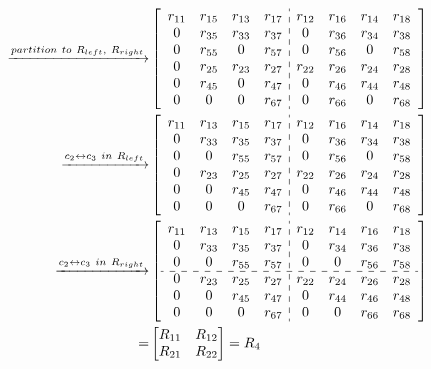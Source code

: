 \documentclass[12pt]{article}
\numberwithin{equation}{section}
\begin{document}
 \begin{align*}
\xrightarrow{partition\ to\ R_{left},\ R_{right}}
&\begin{bmatrix}
\begin{array}{cccc:cccc}
 r_{11} & r_{15} & r_{13} & r_{17} & r_{12} & r_{16} & r_{14} & r_{18}\\
 0      & r_{35} & r_{33} & r_{37} & 0      & r_{36} & r_{34} & r_{38}\\
 0      & r_{55} & 0      & r_{57} & 0      & r_{56} & 0      & r_{58}\\
 0      & r_{25} & r_{23} & r_{27} & r_{22} & r_{26} & r_{24} & r_{28}\\
 0      & r_{45} & 0      & r_{47} & 0      & r_{46} & r_{44} & r_{48}\\
 0      & 0      & 0      & r_{67} & 0      & r_{66} & 0      & r_{68}\\
\end{array}
\end{bmatrix}\\
\xrightarrow{c_{2} \leftrightarrow c_{3}\ in\ R_{left}}
&\begin{bmatrix}
\begin{array}{cccc:cccc}
 r_{11} & r_{13} & r_{15} & r_{17} & r_{12} & r_{16} & r_{14} & r_{18}\\
 0      & r_{33} & r_{35} & r_{37} & 0      & r_{36} & r_{34} & r_{38}\\
 0      & 0      & r_{55} & r_{57} & 0      & r_{56} & 0      & r_{58}\\
 0      & r_{23} & r_{25} & r_{27} & r_{22} & r_{26} & r_{24} & r_{28}\\
 0      & 0      & r_{45} & r_{47} & 0      & r_{46} & r_{44} & r_{48}\\
 0      & 0      & 0      & r_{67} & 0      & r_{66} & 0      & r_{68}\\
\end{array}
\end{bmatrix}\\
\xrightarrow{c_{2} \leftrightarrow c_{3}\ in\ R_{right}}
&\begin{bmatrix}
\begin{array}{cccc:cccc}
 r_{11} & r_{13} & r_{15} & r_{17} & r_{12} & r_{14} & r_{16} & r_{18}\\
 0      & r_{33} & r_{35} & r_{37} & 0      & r_{34} & r_{36} & r_{38}\\
 0      & 0      & r_{55} & r_{57} & 0      & 0      & r_{56} & r_{58}\\
 \cdashline{1-8}
 0      & r_{23} & r_{25} & r_{27} & r_{22} & r_{24} & r_{26} & r_{28}\\
 0      & 0      & r_{45} & r_{47} & 0      & r_{44} & r_{46} & r_{48}\\
 0      & 0      & 0      & r_{67} & 0      & 0      & r_{66} & r_{68}\\
\end{array}
\end{bmatrix} \\
=&\begin{bmatrix}
    R_{11} & R_{12}\\R_{21} & R_{22}
\end{bmatrix} = R_4
\end{align*}
\end{document}
